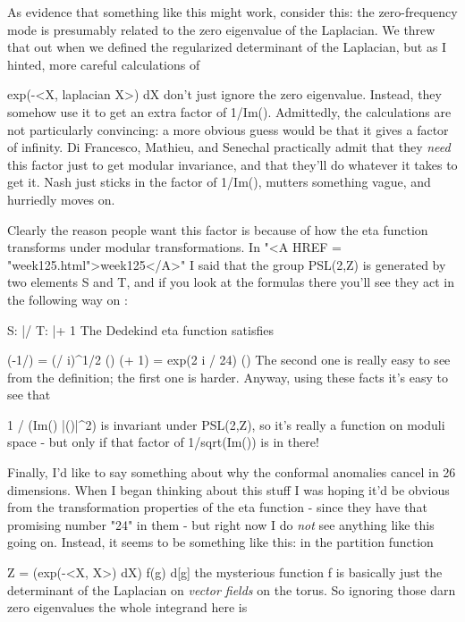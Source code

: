 As evidence that something like this might work, consider this: the
zero-frequency mode is presumably related to the zero eigenvalue of the
Laplacian.  We threw that out when we defined the regularized
determinant of the Laplacian, but as I hinted, more careful calculations
of

                 \int  exp(-<X, laplacian X>) dX
don't just ignore the zero eigenvalue.  Instead, they somehow use it to
get an extra factor of 1/\sqrt Im(\tau ).  Admittedly, the calculations are not
particularly convincing: a more obvious guess would be that it gives a
factor of infinity.  Di Francesco, Mathieu, and Senechal practically
admit that they \emph{need} this factor just to get modular invariance, 
and that they'll do whatever it
takes to get it.  Nash just sticks in the factor of 1/\sqrt Im(\tau ), mutters 
something vague, and hurriedly moves on.

Clearly the reason people want this factor is because of how the eta
function transforms under modular transformations.  In "<A HREF =
"week125.html">week125</A>" I said that the group PSL(2,Z) is
generated by two elements S and T, and if you look at the formulas there
you'll see they act in the following way on \tau :

                     S: \tau  |/\tau   
                     T: \tau  |\to  \tau  + 1
The Dedekind eta function satisfies 

                \eta (-1/\tau )  =      (\tau  / i)^{1/2} \eta (\tau )
                \eta (\tau  + 1) = exp(2 \pi  i / 24) \eta (\tau )
The second one is really easy to see from the definition; the first
one is harder.  Anyway, using these facts it's easy to see that 

                     1 / (\sqrt Im(\tau ) |\eta (\tau )|^{2})
is invariant under PSL(2,Z), so it's really a function on moduli
space - but only if that factor of 1/sqrt(Im(\tau )) is in there!

Finally, I'd like to say something about why the conformal anomalies
cancel in 26 dimensions.  When I began thinking about this stuff I
was hoping it'd be obvious from the transformation properties of the
eta function - since they have that promising number "24" in them - 
but right now I do \emph{not} see anything like this going on.  Instead,
it seems to be something like this: in the partition function

      Z = \int  (\int  exp(-<X, \Delta X>) dX) f(g) d[g]   
the mysterious function f is basically just the determinant of the
Laplacian on \emph{vector fields} on the torus.  So ignoring those 
darn zero eigenvalues the whole integrand here is

